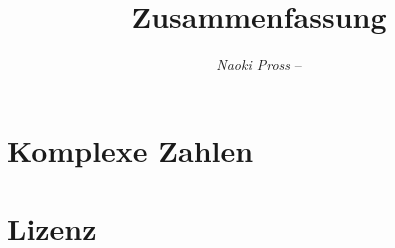 \documentclass[]{tex/hsrzf}
\author{\textsl{Naoki Pross} -- \texttt{\theauthoremail}}
\title{\texttt{\themodule} Zusammenfassung}
\date{\thesemester}
\begin{document}
\maketitle
\tableofcontents

\section{Komplexe Zahlen}

\section{Lizenz}
\doclicenseThis
\end{document}
